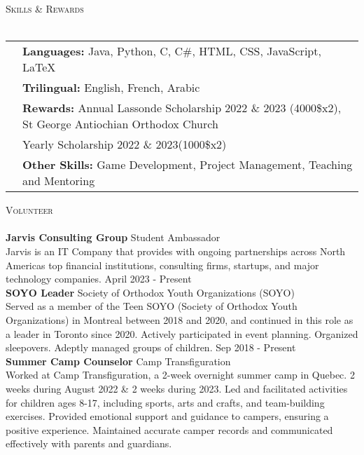 \documentclass[a4paper]{article}
\newcommand{\lineunder} {
	\vspace*{-8pt} \\
	\hspace*{-18pt} \hrulefill \\
}
\newcommand{\header} [1] {
	{\hspace*{-18pt}\vspace*{6pt} \textsc{#1}}
	\vspace*{-6pt} \lineunder
}
\begin{document}
	\header{Skills \& Rewards}
	\begin{tabular}{ l l }
		\vspace{1mm}
		&\textbf{Languages:} Java, Python, C, C\#, HTML, CSS, JavaScript, LaTeX \\
		\vspace{1mm}
		&\textbf{Trilingual:} English, French, Arabic \\
		&\textbf{Rewards:} Annual Lassonde Scholarship 2022 \& 2023 (4000\$x2), St George Antiochian Orthodox Church \\
		\vspace{1mm}
		&\hspace{16.5mm} Yearly Scholarship 2022 \& 2023(1000\$x2)\\
		&\textbf{Other Skills:} Game Development, Project Management, Teaching and Mentoring \\
	\end{tabular}
	\vspace{2mm}
	
	\header{Volunteer}
	\textbf{Jarvis Consulting Group} \hfill Student Ambassador\\
	Jarvis is an IT Company that provides with ongoing partnerships across North America\textquotesingle{}s top financial institutions, consulting firms, startups, and major technology companies. \hfill April 2023 - Present\\
	\vspace*{2mm}
	\textbf{SOYO Leader} \hfill Society of Orthodox Youth Organizations (SOYO)\\
	Served as a member of the Teen SOYO (Society of Orthodox Youth Organizations) in Montreal between 2018 and 2020, and continued in this role as a leader in Toronto since 2020. Actively participated in event planning. Organized sleepovers. Adeptly managed groups of children. \hfill Sep 2018 - Present\\
	\vspace*{2mm}
	\textbf{Summer Camp Counselor} \hfill Camp Transfiguration\\
	Worked at Camp Transfiguration, a 2-week overnight summer camp in Quebec. 2 weeks during August 2022 \& 2 weeks during 2023. Led and facilitated activities for children ages 8-17, including sports, arts and crafts, and team-building exercises. Provided emotional support and guidance to campers, ensuring a positive experience. Maintained accurate camper records and communicated effectively with parents and guardians.\\
	
	\ 
\end{document}
